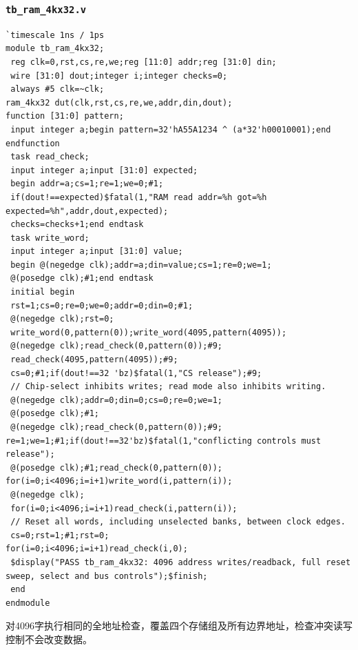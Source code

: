 \documentclass[12pt,a4paper]{ctexart}
\begin{document}
\subsubsection*{\texttt{tb\_ram\_4kx32.v}}
\begin{lstlisting}
`timescale 1ns / 1ps
module tb_ram_4kx32;
 reg clk=0,rst,cs,re,we;reg [11:0] addr;reg [31:0] din;
 wire [31:0] dout;integer i;integer checks=0;
 always #5 clk=~clk;
ram_4kx32 dut(clk,rst,cs,re,we,addr,din,dout);
function [31:0] pattern;
 input integer a;begin pattern=32'hA55A1234 ^ (a*32'h00010001);end endfunction
 task read_check;
 input integer a;input [31:0] expected;
 begin addr=a;cs=1;re=1;we=0;#1;
 if(dout!==expected)$fatal(1,"RAM read addr=%h got=%h expected=%h",addr,dout,expected);
 checks=checks+1;end endtask
 task write_word;
 input integer a;input [31:0] value;
 begin @(negedge clk);addr=a;din=value;cs=1;re=0;we=1;
 @(posedge clk);#1;end endtask
 initial begin
 rst=1;cs=0;re=0;we=0;addr=0;din=0;#1;
 @(negedge clk);rst=0;
 write_word(0,pattern(0));write_word(4095,pattern(4095));
 @(negedge clk);read_check(0,pattern(0));#9;
 read_check(4095,pattern(4095));#9;
 cs=0;#1;if(dout!==32 'bz)$fatal(1,"CS release");#9;
 // Chip-select inhibits writes; read mode also inhibits writing.
 @(negedge clk);addr=0;din=0;cs=0;re=0;we=1;
 @(posedge clk);#1;
 @(negedge clk);read_check(0,pattern(0));#9;
re=1;we=1;#1;if(dout!==32'bz)$fatal(1,"conflicting controls must release");
 @(posedge clk);#1;read_check(0,pattern(0));
for(i=0;i<4096;i=i+1)write_word(i,pattern(i));
 @(negedge clk);
 for(i=0;i<4096;i=i+1)read_check(i,pattern(i));
 // Reset all words, including unselected banks, between clock edges.
 cs=0;rst=1;#1;rst=0;
for(i=0;i<4096;i=i+1)read_check(i,0);
 $display("PASS tb_ram_4kx32: 4096 address writes/readback, full reset sweep, select and bus controls");$finish;
 end
endmodule
\end{lstlisting}
对4096字执行相同的全地址检查，覆盖四个存储组及所有边界地址，检查冲突读写控制不会改变数据。
\end{document}
